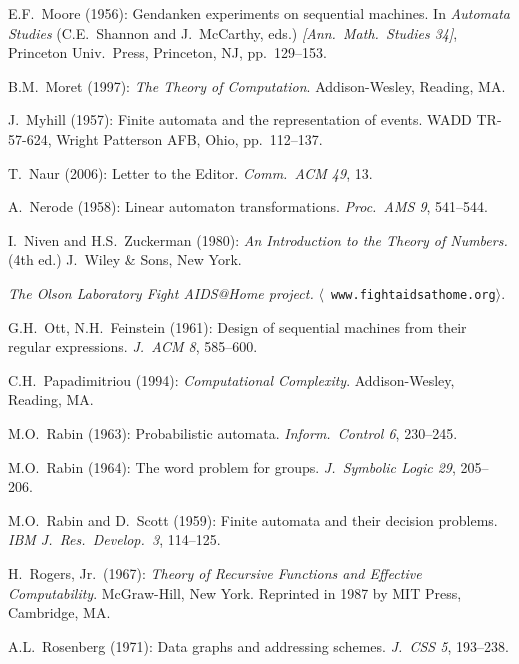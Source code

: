 \begin{thebibliography}{999}
E.F.~Moore (1956): Gendanken experiments on sequential machines.  In
{\it Automata Studies} (C.E.~Shannon and J.~McCarthy, eds.) {\it
[Ann.~Math.~Studies 34]}, Princeton Univ.~Press, Princeton, NJ,
pp.~129--153.

B.M.~Moret (1997):
{\it The Theory of Computation}.
Addison-Wesley, Reading, MA.

J.~Myhill (1957): Finite automata and the representation of events.
WADD TR-57-624, Wright Patterson AFB, Ohio, pp.~112--137.


T.~Naur (2006): Letter to the Editor.  {\it Comm.~ACM 49}, 13.

A.~Nerode (1958): Linear automaton transformations.  {\it Proc.~AMS
9}, 541--544.

I.~Niven and H.S.~Zuckerman (1980):
{\it An Introduction to the Theory of Numbers.} (4th ed.)
J.~Wiley \& Sons, New York.


{\it The Olson Laboratory Fight AIDS@Home project.}  $\langle${\tt
www.fightaidsathome.org}$\rangle$.


G.H.~Ott, N.H.~Feinstein (1961): Design of sequential machines from
their regular expressions.  {\it J.~ACM 8}, 585--600.


C.H.~Papadimitriou (1994):
{\it Computational Complexity}.
Addison-Wesley, Reading, MA.


M.O.~Rabin (1963): Probabilistic automata.  {\it Inform.~Control 6},
230--245.

M.O.~Rabin (1964): The word problem for groups.  {\it J.~Symbolic
Logic 29}, 205--206.

M.O.~Rabin and D.~Scott (1959): Finite automata and their decision
problems.  {\it IBM J.~Res.~Develop.~3}, 114--125.

H.~Rogers, Jr.~(1967):
{\it Theory of Recursive Functions and Effective Computability}.
McGraw-Hill, New York.  Reprinted in 1987 by MIT Press, Cambridge, MA.

A.L.~Rosenberg (1971): Data graphs and addressing schemes.  {\it
J.~CSS 5}, 193--238.


\end{thebibliography}
